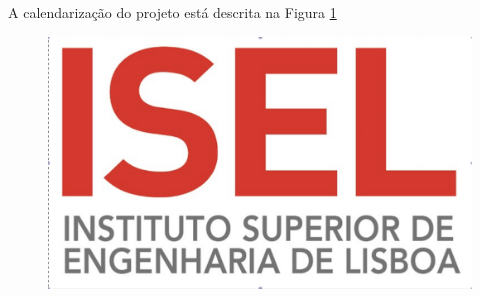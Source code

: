 A calendarização do projeto está descrita na Figura \ref{fig2}
\begin{figure}[!p]
    \centering
    \begin{minipage}[c][\textheight]{393pt}
        \vfill
	\begin{center}
        \includegraphics[scale=0.7,angle=90]{imgs/LOGO_principalGrande}
	\end{center}
	\vfill
    \end{minipage}
    \hspace{2pt}
    \begin{minipage}[c][\textheight]{22.5pt}
        \label{fig2}
    \end{minipage}
\end{figure}